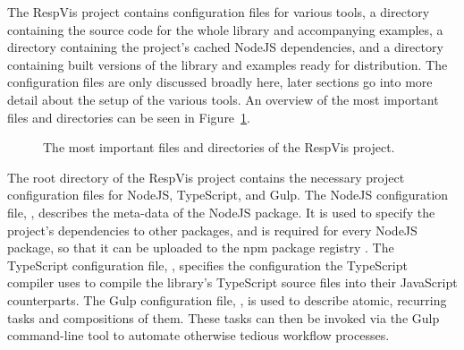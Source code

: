 The RespVis project contains configuration files for various tools, a
 directory containing the source code for the whole library
and accompanying examples, a  directory containing
the project's cached NodeJS dependencies, and a  directory
containing built versions of the library and examples ready for
distribution. The configuration files are only discussed broadly here,
later sections go into more detail about the setup of the various
tools. An overview of the most important files and directories can be
seen in Figure~\ref{fig:RespVisDirTree}.

\begin{figure}[tp]
\centering
{}
\caption[RespVis Directory Structure]{
  The most important files and directories of the RespVis project. 
}
\label{fig:RespVisDirTree}
\end{figure}



The root directory of the RespVis project contains the necessary
project configuration files for NodeJS, TypeScript, and Gulp. The
NodeJS configuration file, , describes the
meta-data of the NodeJS package. It is used to specify the project's
dependencies to other packages, and is required for every NodeJS
package, so that it can be uploaded to the npm package registry
\parencite{npm}. The TypeScript configuration file,
, specifies the configuration the TypeScript
compiler uses to compile the library's TypeScript source files into
their JavaScript counterparts. The Gulp configuration file,
, is used to describe atomic, recurring tasks and
compositions of them. These tasks can then be invoked via the Gulp
command-line tool to automate otherwise tedious workflow processes.

